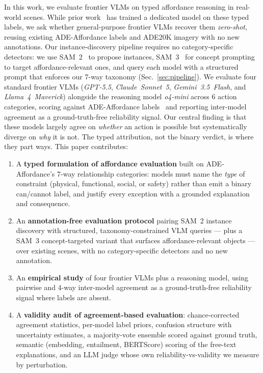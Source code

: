 \documentclass[runningheads]{llncs}
\newcommand{\numactions}{6}
\begin{document}
In this work, we evaluate frontier VLMs on typed affordance reasoning in real-world scenes.
While prior work~\cite{ade_affordance} has trained a dedicated model on these typed labels, we ask whether general-purpose frontier VLMs recover them \emph{zero-shot}, reusing existing ADE-Affordance labels and ADE20K imagery with no new annotations.
Our instance-discovery pipeline requires no category-specific detectors: we use SAM~2~\cite{ravi2025sam2} to propose instances, SAM~3~\cite{sam3} for concept prompting to target affordance-relevant ones, and query each model with a structured prompt that enforces our 7-way taxonomy (Sec.~\ref{sec:pipeline}).
We evaluate four standard frontier VLMs (\emph{GPT-5.5}, \emph{Claude~Sonnet~5}, \emph{Gemini~3.5~Flash}, and \emph{Llama~4~Maverick}) alongside the reasoning model \emph{o4-mini} across \numactions{} action categories, scoring against ADE-Affordance labels~\cite{ade_affordance} and reporting inter-model agreement as a ground-truth-free reliability signal.
Our central finding is that these models largely agree on \emph{whether} an action is possible but systematically diverge on \emph{why} it is not. The typed attribution, not the binary verdict, is where they part ways.
%
\noindent This paper contributes:
\begin{enumerate}\setlength{\itemsep}{1pt}
  \item A \textbf{typed formulation of affordance evaluation} built on ADE-Affordance's 7-way relationship categories: models must name the \emph{type} of constraint (physical, functional, social, or safety) rather than emit a binary can/cannot label, and justify every exception with a grounded explanation and consequence.
  \item An \textbf{annotation-free evaluation protocol} pairing SAM~2 instance discovery with structured, taxonomy-constrained VLM queries --- plus a SAM~3 concept-targeted variant that surfaces affordance-relevant objects --- over existing scenes, with no category-specific detectors and no new annotation.
  \item An \textbf{empirical study} of four frontier VLMs plus a reasoning model, using pairwise and 4-way inter-model agreement as a ground-truth-free reliability signal where labels are absent.
  \item A \textbf{validity audit of agreement-based evaluation}: chance-corrected agreement statistics, per-model label priors, confusion structure with uncertainty estimates, a majority-vote ensemble scored against ground truth, semantic (embedding, entailment, BERTScore) scoring of the free-text explanations, and an LLM judge whose own reliability-vs-validity we measure by perturbation.
\end{enumerate}
\end{document}
